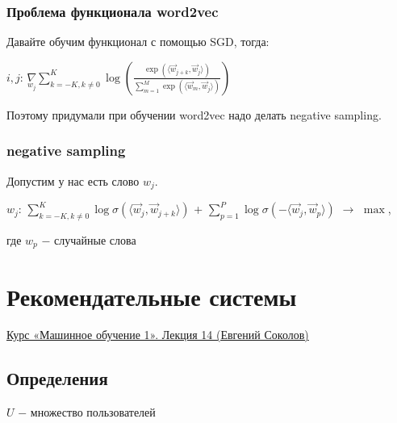             \subsubsection{Проблема функционала word2vec}

                Давайте обучим функционал с помощью SGD, тогда:
                \begin{center}
                    \Large 
                    $i, j$: \quad\quad $\nabla\limits_{w_j}\sum\limits_{k = -K, k \neq 0}^K\log(\frac{\exp(\langle \vec{w}_{j+k}, \vec{w}_j \rangle)}{ \sum\limits_{m = 1}^M \exp(\langle \vec{w}_{m}, \vec{w}_j \rangle)})$ 
                \end{center}

                Поэтому придумали при обучении word2vec надо делать negative sampling.
                
            \subsubsection{negative sampling}

                Допустим у нас есть слово $w_j$.

                \begin{center}
                \Large
                    $w_j$: \quad\quad $\sum\limits_{k = -K, k \neq 0}^K\log\sigma(\langle \vec{w}_{j}, \vec{w}_{j+k} \rangle)$ + $\sum\limits_{p = 1}^P\log\sigma(- \langle \vec{w}_{j}, \vec{w}_{p} \rangle)$ $\longrightarrow$ $\max$,
                \end{center}
                где $w_p$ $-$ случайные слова 
\newpage
\section{Рекомендательные системы}

    \href{https://www.youtube.com/watch?v=fcazJXbfghA&list=PLEqoHzpnmTfChItexxg2ZfxCsm-8QPsdS&index=16}{Курс «Машинное обучение 1». Лекция 14 (Евгений Соколов)}

    \subsection{Определения}
        $U$ $-$ множество пользователей\\

